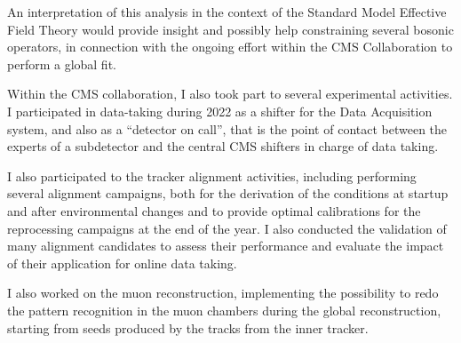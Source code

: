 An interpretation of this analysis in the context of the Standard Model Effective Field Theory %
would provide insight and possibly help constraining several bosonic operators,
in connection with the ongoing effort within the CMS Collaboration to perform a global fit. %

Within the CMS collaboration, I also took part to several experimental activities.
I participated in data-taking during 2022 as a shifter for the Data Acquisition system,
and also as a ``detector on call'', that is the point of contact between the experts of
a subdetector and the central CMS shifters in charge of data taking.

I also participated to the tracker alignment activities,
including performing several alignment campaigns,
both for the derivation of the conditions at startup and after environmental changes
and to provide optimal calibrations for the reprocessing campaigns at the end of the year.
I also conducted the validation of many alignment candidates to assess their performance
and evaluate the impact of their application for online data taking.

I also worked on the muon reconstruction, implementing the possibility to redo
the pattern recognition in the muon chambers during the global reconstruction,
starting from seeds produced by the tracks from the inner tracker.
